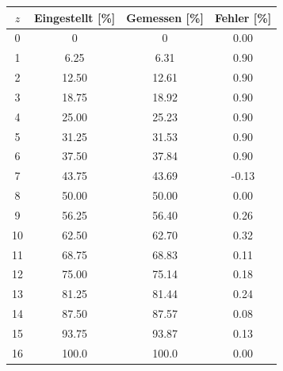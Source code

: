 \label{sec:PWM-Modus}

\noindent\begin{minipage}[t]{.52\linewidth}\vspace{0pt}
\vspace{-1em}
\begin{centering}
\tablevspaceAStable
\begin{tabular}{ @{} >{\RaggedRight\hspace{0pt}} cccc @{} }
    $z$ & Eingestellt [\%] & Gemessen [\%] & Fehler [\%] \\
    \hline
    0 & 0 & 0 & 0.00 \\
    1 & 6.25 & 6.31 & 0.90 \\
    2 & 12.50 & 12.61 & 0.90 \\
    3 & 18.75 & 18.92 & 0.90 \\
    4 & 25.00 & 25.23 & 0.90 \\
    5 & 31.25 & 31.53 & 0.90 \\
    6 & 37.50 & 37.84 & 0.90 \\
    7 & 43.75 & 43.69 & -0.13 \\
    8 & 50.00 & 50.00 & 0.00 \\
    9 & 56.25 & 56.40 & 0.26 \\
    10 & 62.50 & 62.70 & 0.32 \\
    11 & 68.75 & 68.83 & 0.11 \\
    12 & 75.00 & 75.14 & 0.18 \\
    13 & 81.25 & 81.44 & 0.24 \\
    14 & 87.50 & 87.57 & 0.08 \\
    15 & 93.75 & 93.87 & 0.13 \\
    16 & 100.0 & 100.0 & 0.00

\end{tabular}
\label{table:Eingestellte-Gemessene-Frequenzen-PWM}
\end{centering}
\end{minipage}
